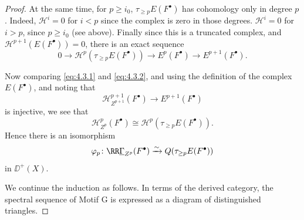 \begin{proof}
At the same time, for $p\geq i_0$, $\tau_{\geq p}E(F^\bullet)$ has cohomology only in degree $p$. Indeed, $\mathcal{H}^{i}=0$ for $i<p$ since the complex is zero in those degrees. $\mathcal{H}^{i}=0$ for $i>p$, since $p\geq i_0$ (see above). Finally since this is a truncated complex, and $\mathcal{H}^{p+1}(E(F^\bullet))=0$, there is an exact sequence
\begin{equation}\tag{2}\label{eq:4.3.2}
0\longrightarrow \mathcal{H}^{p}(\tau_{\geq p}E(F^\bullet))\longrightarrow E^{p}(F^\bullet)\longrightarrow E^{p+1}(F^\bullet).
\end{equation}

Now comparing \eqref{eq:4.3.1} and \eqref{eq:4.3.2}, and using the definition of the complex $E(F^\bullet)$, and noting that
\[
\mathcal{H}_{Z^{p+1}}^{p+1}(F^\bullet)\longrightarrow E^{p+1}(F^\bullet)
\]
is injective, we see that
\[
\mathcal{H}_{Z^{p}}^{p}(F^\bullet)\cong \mathcal{H}^{p}(\tau_{\geq p}E(F^\bullet)).
\]
Hence there is an isomorphism 
\[
\varphi_p\colon \RR\underline{\Gamma}_{Z^p}(F^\bullet)\xrightarrow{\sim} Q(\tau_{\geq p}E(F^\bullet))
\]
in $\DD^+(X)$.

We continue the induction as follows. In terms of the derived category, the spectral sequence of Motif G is expressed as a diagram of distinguished triangles.


\end{proof}
